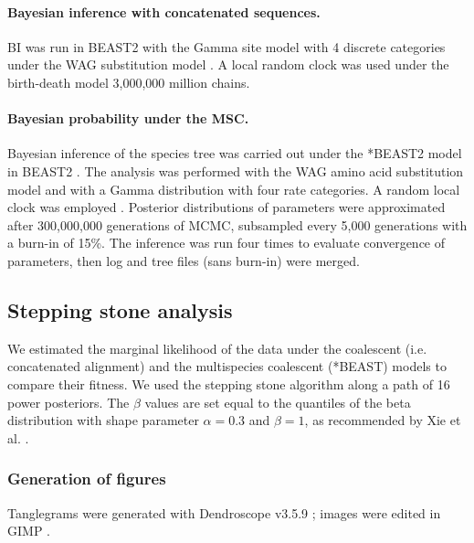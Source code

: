 \documentclass[fleqn,10pt,lineno]{wlpeerj} %
\begin{document}
\paragraph*{Bayesian inference with concatenated sequences.}
BI was run in BEAST2 with the Gamma site model with 4 discrete categories under the WAG substitution model \cite{whelan2001general}. A local random clock was used under the birth-death model 3,000,000 million chains.
\paragraph*{Bayesian probability under the MSC.}
Bayesian inference of the species tree was carried out under the *BEAST2 model in BEAST2 \cite{bouckaert2014beast}. 
The analysis was performed with the WAG amino acid substitution model \cite{whelan2001general} and with a Gamma distribution with four rate categories. 
A random local clock was employed \cite{drummond2010bayesian}. 
Posterior distributions of parameters were approximated after 300,000,000 generations of MCMC, subsampled every 5,000 generations with a burn-in of 15\%. 
The inference was run four times to evaluate convergence of parameters, then log and tree files (sans burn-in) were merged. 


\subsection*{Stepping stone analysis}
We estimated the marginal likelihood of the data under the coalescent (i.e. concatenated alignment) and the multispecies coalescent (*BEAST) models to compare their fitness.
We used the stepping stone algorithm \citep{xie2011improving} along a path of 16 power posteriors.
The $\beta$ values are set equal to the quantiles of the beta distribution with shape parameter $\alpha=0.3$ and $\beta = 1$, as recommended by Xie et al. \cite{xie2011improving}.

\subsubsection*{Generation of figures}
Tanglegrams were generated with Dendroscope v3.5.9 \cite{huson2007dendroscope}; images were edited in GIMP \cite{gimp2008image}.
\end{document}
